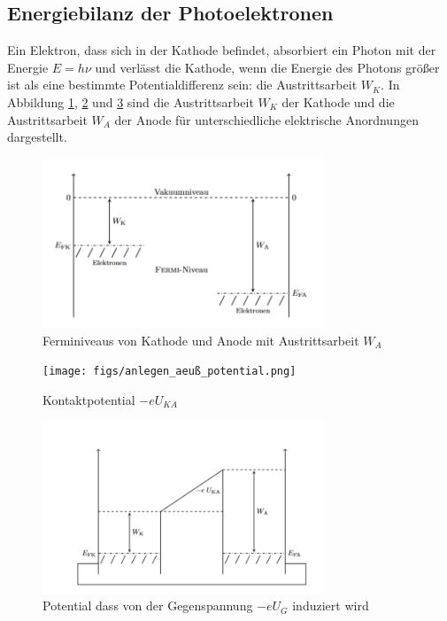 
\subsection{Energiebilanz der Photoelektronen}
Ein Elektron, dass sich in der Kathode befindet, absorbiert ein Photon mit der Energie $E = h\nu$ und verlässt die Kathode, wenn die Energie des Photons größer ist als eine bestimmte Potentialdifferenz sein: die Austrittsarbeit $W_K$.
In Abbildung \ref{fig:kathode-anode}, \ref{fig:potential ext} und \ref{fig:potential kurzg.} sind die Austrittsarbeit $W_K$ der Kathode und die Austrittsarbeit $W_A$ der Anode für unterschiedliche elektrische Anordnungen dargestellt.\\ %

\begin{figure}[htbp]
    \centering
    \includegraphics[width=0.75\textwidth]{figs/baenderschema_kathode_anode.png}
    \caption{ Ferminiveaus von Kathode und Anode mit Austrittsarbeit $W_A$ \cite{praktikum}}
    \label{fig:kathode-anode}
\end{figure}
\FloatBarrier

\begin{figure}[htbp]
    \centering
    \texttt{[image: figs/anlegen\_aeuß\_potential.png]}
    \caption{ Kontaktpotential $-eU_{KA}$ \cite{praktikum}}
    \label{fig:potential ext}
\end{figure}
\FloatBarrier

\begin{figure}[htbp]
    \centering
    \includegraphics[width=0.75\textwidth]{figs/kontaktpotential_kurzgeschl_elektroden.png}
    \caption{  Potential dass von der Gegenspannung
$-eU_G$ induziert wird\cite{praktikum}}
    \label{fig:potential kurzg.}
\end{figure}
\FloatBarrier



